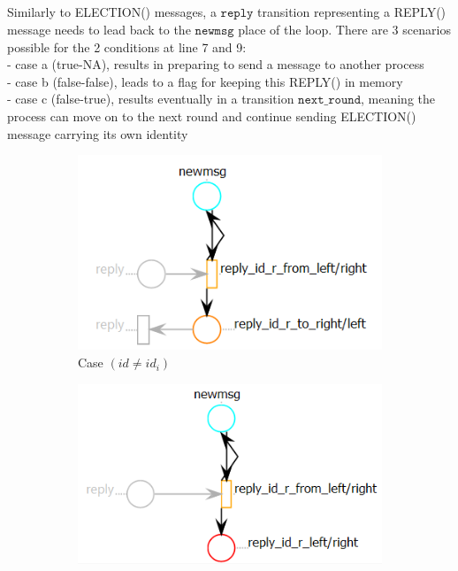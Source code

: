 \documentclass{article}
\begin{document}
	\subparagraph{}Similarly to ELECTION() messages, a $\mathtt{reply}$ transition representing a REPLY() message needs to lead back to the $\mathtt{newmsg}$ place of the loop. There are 3 scenarios possible for the 2 conditions at line 7 and 9: \\- case a (true-NA), results in preparing to send a message to another process
	\\- case b (false-false), leads to a flag for keeping this REPLY() in memory
	\\- case c (false-true), results eventually in a transition $\mathtt{next\_round}$, meaning the process can move on to the next round and continue sending ELECTION() message carrying its own identity
	\newpage
	\begin{figure}[ht] 
		\begin{subfigure}[b]{0.5\linewidth}
			\centering
			\hspace*{-40pt}
			\includegraphics[scale=0.6]{reply_cas1} 
			\caption{Case $(id\neq id_i)$} 
			\label{fig14:a} 
			\vspace{4ex}
		\end{subfigure}%
		\begin{subfigure}[b]{0.4\linewidth}
			\centering
			\hspace*{10pt}
			\includegraphics[scale=0.6]{reply_cas2} 

\end{subfigure}
\end{figure}
\end{document}
